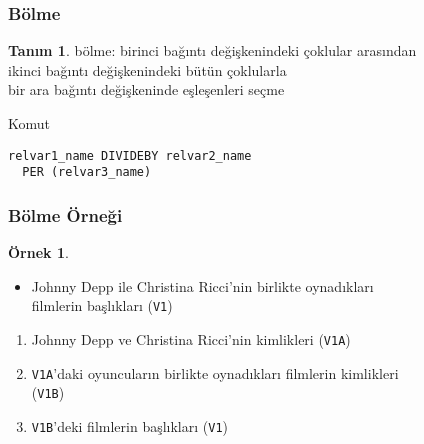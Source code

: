 \documentclass[dvipsnames]{beamer}
\theoremstyle{definition}
\newtheorem{tanim}[theorem]{Tanım}
\theoremstyle{example}
\newtheorem{ornek}[theorem]{Örnek}
\theoremstyle{plain}
\begin{document}
\begin{frame}[fragile]
  \frametitle{Bölme}

  \begin{tanim}
    \alert{bölme}:  birinci bağıntı değişkenindeki çoklular arasından\\
      ikinci bağıntı değişkenindeki bütün çoklularla\\
      bir ara bağıntı değişkeninde eşleşenleri seçme
  \end{tanim}

  \pause
  \begin{block}{Komut}
    \begin{lstlisting}
relvar1_name DIVIDEBY relvar2_name
  PER (relvar3_name)
    \end{lstlisting}
  \end{block}
\end{frame}

\begin{frame}
  \frametitle{Bölme Örneği}

  \begin{ornek}
    \begin{itemize}
      \item Johnny Depp ile Christina Ricci'nin birlikte oynadıkları\\
        filmlerin başlıkları (\texttt{V1})
    \end{itemize}

    \pause
    \begin{enumerate}
      \item Johnny Depp ve Christina Ricci'nin kimlikleri (\texttt{V1A})

      \pause
      \item \texttt{V1A}'daki oyuncuların birlikte oynadıkları filmlerin
        kimlikleri\\
        (\texttt{V1B})

      \pause
      \item \texttt{V1B}'deki filmlerin başlıkları (\texttt{V1})
    \end{enumerate}
  \end{ornek}
\end{frame}
\end{document}
